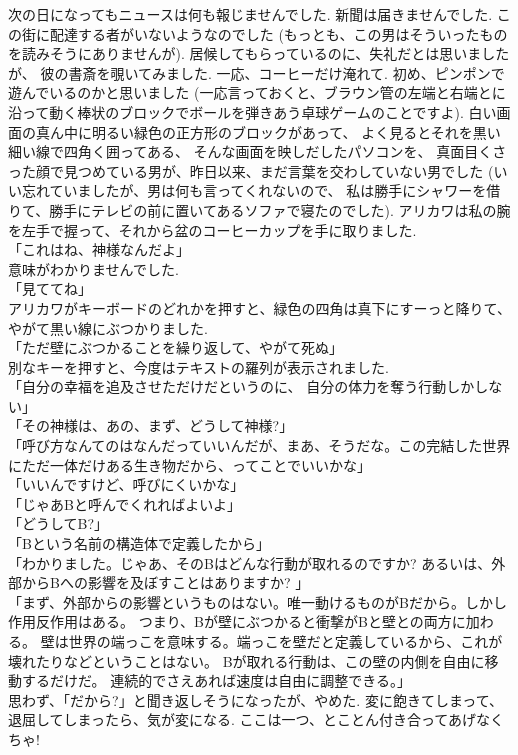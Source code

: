 次の日になってもニュースは何も報じませんでした.
新聞は届きませんでした.
この街に配達する者がいないようなのでした
(もっとも、この男はそういったものを読みそうにありませんが).
居候してもらっているのに、失礼だとは思いましたが、
彼の書斎を覗いてみました.
一応、コーヒーだけ淹れて.
初め、ピンポンで遊んでいるのかと思いました
(一応言っておくと、ブラウン管の左端と右端とに沿って動く棒状のブロックでボールを弾きあう卓球ゲームのことですよ).
白い画面の真ん中に明るい緑色の正方形のブロックがあって、
よく見るとそれを黒い細い線で四角く囲ってある、
そんな画面を映しだしたパソコンを、
真面目くさった顔で見つめている男が、昨日以来、まだ言葉を交わしていない男でした
(いい忘れていましたが、男は何も言ってくれないので、
私は勝手にシャワーを借りて、勝手にテレビの前に置いてあるソファで寝たのでした).
アリカワは私の腕を左手で握って、それから盆のコーヒーカップを手に取りました.\\
「これはね、神様なんだよ」\\
意味がわかりませんでした.\\
「見ててね」\\
アリカワがキーボードのどれかを押すと、緑色の四角は真下にすーっと降りて、
やがて黒い線にぶつかりました.\\
「ただ壁にぶつかることを繰り返して、やがて死ぬ」\\
別なキーを押すと、今度はテキストの羅列が表示されました.\\
「自分の幸福を追及させただけだというのに、
自分の体力を奪う行動しかしない」\\
「その神様は、あの、まず、どうして神様?」\\
「呼び方なんてのはなんだっていいんだが、まあ、そうだな。この完結した世界にただ一体だけある生き物だから、ってことでいいかな」\\
「いいんですけど、呼びにくいかな」\\
「じゃあBと呼んでくれればよいよ」\\
「どうしてB?」\\
「Bという名前の構造体で定義したから」\\
「わかりました。じゃあ、そのBはどんな行動が取れるのですか? あるいは、外部からBへの影響を及ぼすことはありますか? 」\\
「まず、外部からの影響というものはない。唯一動けるものがBだから。しかし作用反作用はある。
つまり、Bが壁にぶつかると衝撃がBと壁との両方に加わる。
壁は世界の端っこを意味する。端っこを壁だと定義しているから、これが壊れたりなどということはない。
Bが取れる行動は、この壁の内側を自由に移動するだけだ。
連続的でさえあれば速度は自由に調整できる。」\\
思わず、「だから?」と聞き返しそうになったが、やめた.
変に飽きてしまって、退屈してしまったら、気が変になる.
ここは一つ、とことん付き合ってあげなくちゃ!

